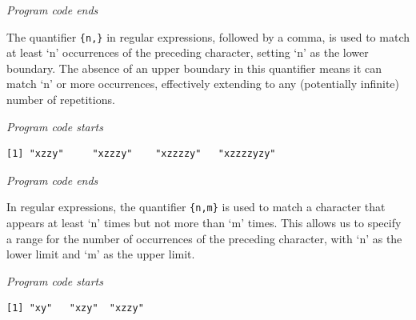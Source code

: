 \emph{Program code ends}

The quantifier \texttt{\{n,\}} in regular expressions, followed by a
comma, is used to match at least `n' occurrences of the preceding
character, setting `n' as the lower boundary. The absence of an upper boundary
in this quantifier means it can match `n' or more occurrences,
effectively extending to any (potentially infinite) number of
repetitions.

\emph{Program code starts}

\begin{Shaded}
\begin{Highlighting}[]
\NormalTok{(} \NormalTok{)}
\end{Highlighting}
\end{Shaded}

\begin{verbatim}
[1] "xzzy"     "xzzzy"    "xzzzzy"   "xzzzzyzy"
\end{verbatim}

\emph{Program code ends}

In regular expressions, the quantifier \texttt{\{n,m\}} is used to match
a character that appears at least `n' times but not more than `m' times.
This allows us to specify a range for the number of occurrences of the
preceding character, with `n' as the lower limit and `m' as the upper
limit.

\emph{Program code starts}

\begin{Shaded}
\begin{Highlighting}[]
\NormalTok{(} \NormalTok{)}
\end{Highlighting}
\end{Shaded}

\begin{verbatim}
[1] "xy"   "xzy"  "xzzy"
\end{verbatim}

